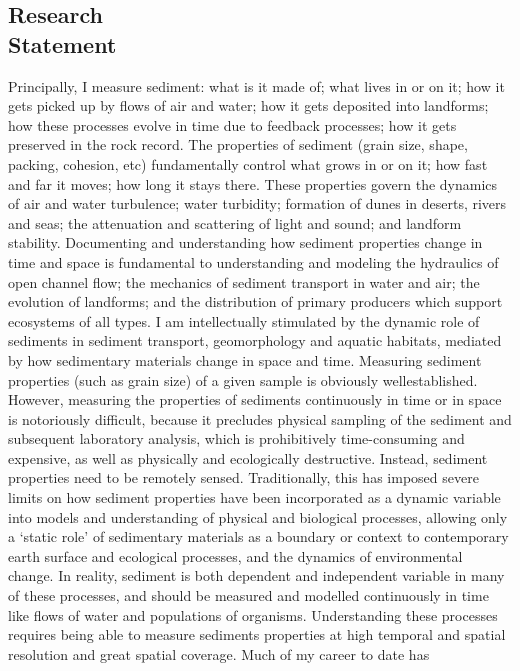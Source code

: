 \documentclass[margin,line]{resume}
\begin{document}
\begin{resume}
\section{\mysidestyle Research\\Statement}
    \begin{footnotesize}
Principally, I measure sediment: what is it made of; what lives in or on it; how it gets picked up by flows of
air and water; how it gets deposited into landforms; how these processes evolve in time due to
feedback processes; how it gets preserved in the rock record. The properties of sediment (grain
size, shape, packing, cohesion, etc) fundamentally control what grows in or on it; how fast and
far it moves; how long it stays there. These properties govern the dynamics of air and water
turbulence; water turbidity; formation of dunes in deserts, rivers and seas; the attenuation and
scattering of light and sound; and landform stability. Documenting and understanding how
sediment properties change in time and space is fundamental to understanding and modeling the
hydraulics of open channel flow; the mechanics of sediment transport in water and air; the
evolution of landforms; and the distribution of primary producers which support ecosystems of
all types. I am intellectually stimulated by the dynamic role of sediments in sediment transport,
geomorphology and aquatic habitats, mediated by how sedimentary materials change in space
and time. Measuring sediment properties (such as grain size) of a given sample is obviously wellestablished. However, measuring the properties of sediments continuously in time or in space is notoriously difficult, because it precludes physical sampling of the sediment and subsequent
laboratory analysis, which is prohibitively time-consuming and expensive, as well as physically
and ecologically destructive. Instead, sediment properties need to be remotely sensed.
Traditionally, this has imposed severe limits on how sediment properties have been incorporated
as a dynamic variable into models and understanding of physical and biological processes,
allowing only a ‘static role’ of sedimentary materials as a boundary or context to contemporary
earth surface and ecological processes, and the dynamics of environmental change. In reality,
sediment is both dependent and independent variable in many of these processes, and should be
measured and modelled continuously in time like flows of water and populations of organisms.
Understanding these processes requires being able to measure sediments properties at high
temporal and spatial resolution and great spatial coverage. Much of my career to date has

\end{footnotesize}
\end{resume}
\end{document}
